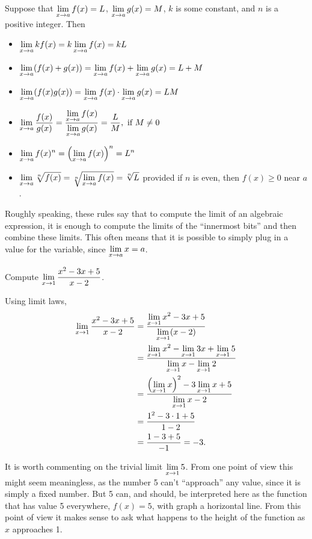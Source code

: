 \begin{mainTheorem}\label{theorem:limit-laws}
Suppose that $\displaystyle \lim_{x\to a}f(x)=L$, $\displaystyle \lim_{x\to a}g(x)=M$, $k$
is some constant, and $n$ is a positive integer. Then
\begin{itemize}
\item $\displaystyle\lim_{x\to a} kf(x) = k\lim_{x\to a}f(x)=kL$ 
\item $\displaystyle\lim_{x\to a} (f(x)+g(x)) = \lim_{x\to a}f(x)+\lim_{x\to a}g(x)=L+M$  
\item $\displaystyle\lim_{x\to a} (f(x)g(x)) = \lim_{x\to a}f(x)\cdot\lim_{x\to a}g(x)=LM$ 
\item $\displaystyle\lim_{x\to a} \frac{f(x)}{g(x)} = \frac{\displaystyle\lim_{x\to a}f(x)}{\displaystyle\lim_{x\to
    a}g(x)}=\frac{L}{M},\text{ if $M\ne0$}$
\item $\displaystyle\lim_{x\to a} f(x)^n = \left(\displaystyle\lim_{x\to a}f(x)\right)^n=L^n$
\item $\displaystyle\lim_{x\to a} \sqrt[n]{f(x)} = \sqrt[n]{\displaystyle\lim_{x\to
    a}f(x)}=\sqrt[n]{L}$ provided if $n$ is even, then $f(x)\ge 0$
  near $a$.
\end{itemize}
\label{thm:limit laws}
\end{mainTheorem}

Roughly speaking, these rules say that to compute the limit of an
algebraic expression, it is enough to compute the limits of the
``innermost bits'' and then combine these limits. This often means
that it is possible to simply plug in a value for the variable, since
$\displaystyle \lim_{x\to a} x =a$.


\begin{example}
Compute $\displaystyle \lim_{x\to 1}{x^2-3x+5\over x-2}$. 
\end{example}
\begin{solution}
Using limit laws, 
\begin{align*}
\lim_{x\to 1}{x^2-3x+5\over x-2}&=
\dfrac{\displaystyle\lim_{x\to 1}x^2-3x+5}{\displaystyle\lim_{x\to1}(x-2)} \\
&=\dfrac{\displaystyle\lim_{x\to 1}x^2-\displaystyle\lim_{x\to1}3x+\lim_{x\to1}5}{\displaystyle\lim_{x\to1}x-\displaystyle\lim_{x\to1}2} \\
&=\dfrac{\left(\displaystyle\lim_{x\to 1}x\right)^2-3\displaystyle\lim_{x\to1}x+5}{\displaystyle\lim_{x\to1}x-2} \\
&=\dfrac{1^2-3\cdot1+5}{1-2} \\
&=\dfrac{1-3+5}{-1} = -3.
\end{align*}
\end{solution}


It is worth commenting on the trivial limit $\displaystyle \lim_{x\to1}5$. From one
point of view this might seem meaningless, as the number 5 can't
``approach'' any value, since it is simply a fixed number. But 5 can,
and should, be interpreted here as the function that has value 5
everywhere, $f(x)=5$, with graph a horizontal line. From this point of
view it makes sense to ask what happens to the height of the function
as $x$ approaches 1.

